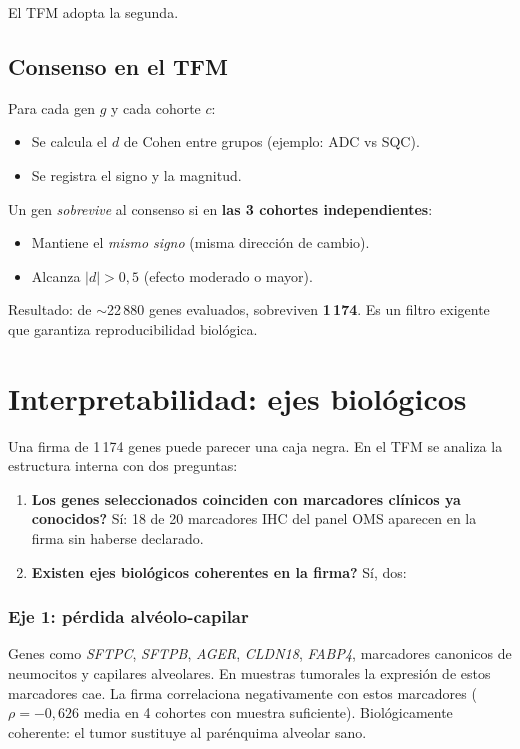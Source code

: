 \documentclass[11pt, a4paper]{article}
\newcommand{\gene}[1]{\textit{#1}}
\begin{document}
El TFM adopta la segunda.

\subsection{Consenso en el TFM}

Para cada gen $g$ y cada cohorte $c$:
\begin{itemize}[leftmargin=1.2em]
  \item Se calcula el $d$ de Cohen entre grupos (ejemplo: ADC vs SQC).
  \item Se registra el signo y la magnitud.
\end{itemize}

Un gen \emph{sobrevive} al consenso si en \textbf{las 3 cohortes
independientes}:
\begin{itemize}[leftmargin=1.2em]
  \item Mantiene el \emph{mismo signo} (misma direcci\'on de cambio).
  \item Alcanza $|d| > 0{,}5$ (efecto moderado o mayor).
\end{itemize}

Resultado: de $\sim$22\,880 genes evaluados, sobreviven \textbf{1\,174}.
Es un filtro exigente que garantiza reproducibilidad biol\'ogica.

\section{Interpretabilidad: ejes biol\'ogicos}

Una firma de 1\,174 genes puede parecer una caja negra. En el TFM se
analiza la estructura interna con dos preguntas:

\begin{enumerate}[leftmargin=1.4em]
  \item \textbf{Los genes seleccionados coinciden con marcadores
  cl\'inicos ya conocidos?} S\'i: 18 de 20 marcadores IHC del panel OMS
  aparecen en la firma sin haberse declarado.
  \item \textbf{Existen ejes biol\'ogicos coherentes en la firma?} S\'i,
  dos:
\end{enumerate}

\subsubsection*{Eje 1: p\'erdida alv\'eolo-capilar}
Genes como \gene{SFTPC}, \gene{SFTPB}, \gene{AGER}, \gene{CLDN18},
\gene{FABP4}, marcadores canonicos de neumocitos y capilares alveolares.
En muestras tumorales la expresi\'on de estos marcadores cae. La firma
correlaciona negativamente con estos marcadores ($\rho = -0{,}626$ media
en 4 cohortes con muestra suficiente). Biol\'ogicamente coherente: el
tumor sustituye al par\'enquima alveolar sano.
\end{document}

